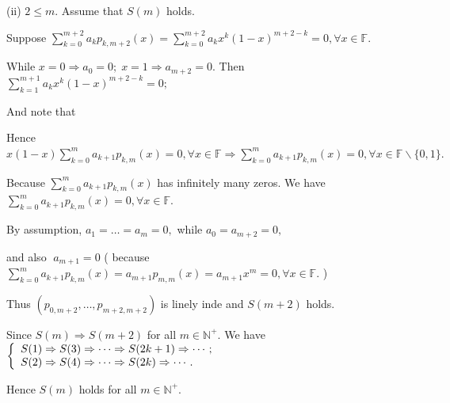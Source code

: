\documentclass[a4paper, 11pt, UTF8]{article}
\def\Fbb{{\mathbb{F}}}
\def\Nbp{{\mathbb{N}^+}}
\def\Hii{\quad\hspace{7pt}}
\begin{document}
\begin{large}
(ii) $2\leq m.$ Assume that $S(m)$ holds.\par\quad\Hii
Suppose\; $\displaystyle\sum\limits_{k=0}^{m+2}a_kp_{k,m+2}(x)=\sum\limits_{k=0}^{m+2}a_kx^k(1-x)^{m+2-k}=0,\forall x\in\Fbb.$\par\quad\Hii
While $x=0\Rightarrow a_0=0;\;x=1\Rightarrow a_{m+2}=0.$ Then $\sum\limits_{k=1}^{m+1}a_kx^k(1-x)^{m+2-k}=0;$\vspace{12pt}\par\quad\Hii
And note that \vspace{-12pt}\vspace{10pt}\par\quad\Hii
Hence $x(1-x)\sum_{k=0}^{m}a_{k+1}p_{k,m}(x)=0,\forall x\in\Fbb\Rightarrow \sum_{k=0}^{m}a_{k+1}p_{k,m}(x)=0,\forall x\in\Fbb\backslash\{0,1\}.$\par\quad\Hii
Because $\sum_{k=0}^{m}a_{k+1}p_{k,m}(x)$ has infinitely many zeros. We have $\sum_{k=0}^{m}a_{k+1}p_{k,m}(x)=0,\forall x\in\Fbb.$\par\quad\Hii
By assumption, $a_1=\dots=a_m=0,$ while $a_0=a_{m+2}=0,$\par\quad\Hii
\hspace{34pt}and also $\;a_{m+1}=0$ ( because $\sum_{k=0}^{m}a_{k+1}p_{k,m}(x)=a_{m+1}p_{m,m}(x)=a_{m+1}x^m=0,\forall x\in\Fbb.$ )\par\quad\Hii
Thus $(p_{0,m+2},\dots,p_{m+2,m+2})$ is linely inde and $S(m+2)$ holds.\vspace{6pt}\par\quad
Since $S(m)\Rightarrow S(m+2)$ for all $m\in\Nbp.$ We have $\MathLeftBrace{l}{S(1)\Rightarrow S(3)\Rightarrow\cdots\Rightarrow S(2k+1)\Rightarrow \cdots;\\S(2)\Rightarrow S(4)\Rightarrow\cdots\Rightarrow S(2k)\Rightarrow\cdots.}$\par\quad
Hence $S(m)$ holds for all $m\in\Nbp.$\PfEnd
\SepLine


\end{large}
\end{document}
